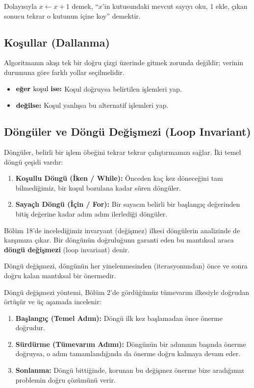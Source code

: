 Dolayısıyla $x \leftarrow x + 1$ demek, ``$x$'in kutusundaki mevcut sayıyı oku, 1 ekle, çıkan sonucu tekrar o kutunun içine koy'' demektir.

\subsection{Koşullar (Dallanma)}

Algoritmanın akışı tek bir doğru çizgi üzerinde gitmek zorunda değildir; verinin durumuna göre farklı yollar seçilmelidir.
\begin{itemize}
    \item $\text{\textbf{eğer }} \text{koşul} \text{ \textbf{ise:}}$ Koşul doğruysa belirtilen işlemleri yap.
    \item $\text{\textbf{değilse:}}$ Koşul yanlışsa bu alternatif işlemleri yap.
\end{itemize}

\subsection{Döngüler ve Döngü Değişmezi (Loop Invariant)}

Döngüler, belirli bir işlem öbeğini tekrar tekrar çalıştırmamızı sağlar. İki temel döngü çeşidi vardır:
\begin{enumerate}
    \item \textbf{Koşullu Döngü (İken / While):} Önceden kaç kez döneceğini tam bilmediğimiz, bir koşul bozulana kadar süren döngüler.
    \item \textbf{Sayaçlı Döngü (İçin / For):} Bir sayacın belirli bir başlangıç değerinden bitiş değerine kadar adım adım ilerlediği döngüler.
\end{enumerate}

Bölüm 18'de incelediğimiz invaryant (değişmez) ilkesi döngülerin analizinde de karşımıza çıkar. Bir döngünün doğruluğunu garanti eden bu mantıksal araca \textbf{döngü değişmezi} (loop invariant) denir.

\begin{definition}
Döngü değişmezi, döngünün her yinelenmesinden (iterasyonundan) önce ve sonra doğru kalan mantıksal bir önermedir.
\end{definition}

Döngü değişmezi yöntemi, Bölüm 2'de gördüğümüz tümevarım ilkesiyle doğrudan örtüşür ve üç aşamada incelenir:
\begin{enumerate}
    \item \textbf{Başlangıç (Temel Adım):} Döngü ilk kez başlamadan önce önerme doğrudur.
    \item \textbf{Sürdürme (Tümevarım Adımı):} Döngünün bir adımının başında önerme doğruysa, o adım tamamlandığında da önerme doğru kalmaya devam eder.
    \item \textbf{Sonlanma:} Döngü bittiğinde, korunan bu değişmez önerme bize aradığımız problemin doğru çözümünü verir.
\end{enumerate}

